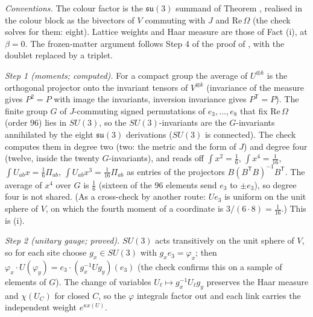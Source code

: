 \emph{Conventions.} The colour factor is the $\mathfrak{su}(3)$ summand of Theorem , realised in the colour block as the bivectors of $V$ commuting with $J$ and $\mathrm{Re}\,\Omega$ (the check solves for them: eight). Lattice weights and Haar measure are those of Fact (i), at $\beta = 0$. The frozen-matter argument follows Step 4 of the proof of , with the doublet replaced by a triplet.

\emph{Step 1 (moments; computed).} For a compact group the average of $U^{\otimes k}$ is the orthogonal projector onto the invariant tensors of $V^{\otimes k}$ (invariance of the measure gives $P^{2} = P$ with image the invariants, inversion invariance gives $P^{\mathsf T} = P$). The finite group $G$ of $J$-commuting signed permutations of $e_{3}, \dots, e_{8}$ that fix $\mathrm{Re}\,\Omega$ (order $96$) lies in $SU(3)$, so the $SU(3)$-invariants are the $G$-invariants annihilated by the eight $\mathfrak{su}(3)$ derivations ($SU(3)$ is connected). The check computes them in degree two (two: the metric and the form of $J$) and degree four (twelve, inside the twenty $G$-invariants), and reads off $\int x^{2} = \tfrac16$, $\int x^{4} = \tfrac1{16}$, $\int U_{ab}x = \tfrac16\Pi_{ab}$, $\int U_{ab}x^{3} = \tfrac1{16}\Pi_{ab}$ as entries of the projectors $B(B^{\mathsf T}B)^{-1}B^{\mathsf T}$. The average of $x^{4}$ over $G$ is $\tfrac16$ (sixteen of the $96$ elements send $e_{3}$ to $\pm e_{3}$), so degree four is not shared. (As a cross-check by another route: $Ue_{3}$ is uniform on the unit sphere of $V$, on which the fourth moment of a coordinate is $3/(6 \cdot 8) = \tfrac1{16}$.) This is (i).

\emph{Step 2 (unitary gauge; proved).} $SU(3)$ acts transitively on the unit sphere of $V$, so for each site choose $g_{x} \in SU(3)$ with $g_{x}e_{3} = \varphi_{x}$; then $\varphi_{x}\cdot U(\varphi_{y}) = e_{3}\cdot(g_{x}^{-1}Ug_{y})(e_{3})$ (the check confirms this on a sample of elements of $G$). The change of variables $U_{\ell} \mapsto g_{x}^{-1}U_{\ell}g_{y}$ preserves the Haar measure and $\chi(U_{C})$ for closed $C$, so the $\varphi$ integrals factor out and each link carries the independent weight $e^{\kappa x(U)}$.

